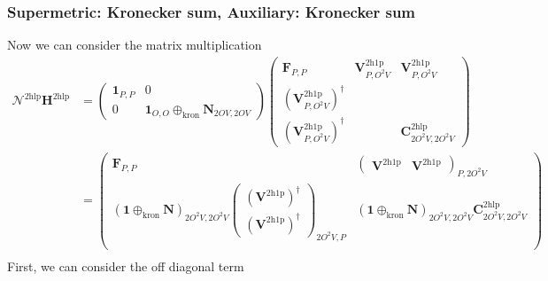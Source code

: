 \subsubsection{Supermetric: Kronecker sum, Auxiliary: Kronecker sum}
Now we can consider the matrix multiplication
\begin{align}
    \bm{\mathcal{N}}^{2 \mathrm{hlp}} \bm{H}^{2 \mathrm{hlp}} &= \begin{pmatrix}
        \bm{1}_{P,P} & 0 \\
        0 & \bm{1}_{O,O} \oplus_{\text{kron}} \bm{N}_{2OV,2OV}
    \end{pmatrix}
    \begin{pmatrix}
        \bm{F}_{P,P} & \bm{V}^{2\mathrm{h1p}}_{P,O^2V} & \bm{V}^{2\mathrm{h1p}}_{P,O^2V} \\
        \left(\bm{V}^{2\mathrm{h1p}}_{P,O^2V}\right)^{\dagger} &  &  \\
        \left(\bm{V}^{2\mathrm{h1p}}_{P,O^2V}\right)^{\dagger} &  & \bm{C}^{2\mathrm{hlp}}_{2O^2V,2O^2V}
    \end{pmatrix} \\
&= \begin{pmatrix}        \bm{F}_{P,P} & \begin{pmatrix} \bm{V}^{2\mathrm{h1p}} & \bm{V}^{2\mathrm{h1p}}\end{pmatrix}_{P,2O^2V} \\
        \left( \bm{1} \oplus_{\text{kron}} \bm{N} \right)_{2O^2V,2O^2V}\begin{pmatrix} \left(\bm{V}^{2\mathrm{h1p}}\right)^{\dagger} \\ \left( \bm{V}^{2\mathrm{h1p}}\right)^{\dagger} \end{pmatrix}_{2O^2V,P} &   \left( \bm{1} \oplus_{\text{kron}} \bm{N} \right)_{2O^2V,2O^2V} \bm{C}^{2\mathrm{hlp}}_{2O^2V,2O^2V}  \\
    \end{pmatrix} \\
\end{align}
First, we can consider the off diagonal term
